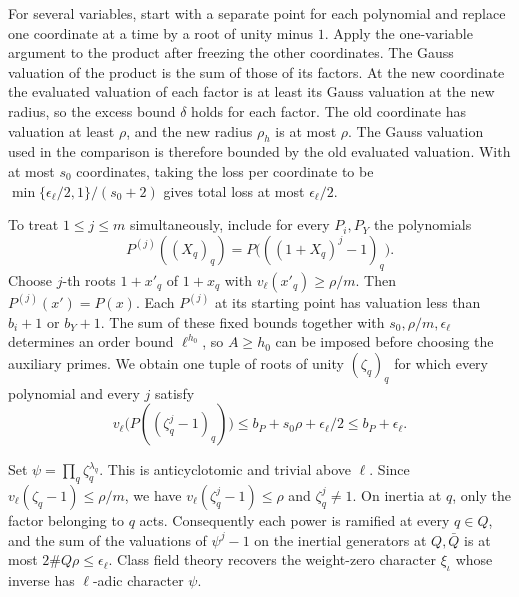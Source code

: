 For several variables, start with a separate point for each polynomial
and replace one coordinate at a time by a root of unity minus \(1\).
Apply the one-variable argument to the product after freezing the other
coordinates. The Gauss valuation of the product is the sum of those
of its factors. At the new coordinate the evaluated valuation of
each factor is at least its Gauss valuation at the new radius, so
the excess bound \(\delta\) holds for each factor. The old coordinate
has valuation at least \(\rho\), and the new radius \(\rho_h\) is
at most \(\rho\). The Gauss valuation used in the comparison is
therefore bounded by the old evaluated valuation. With at most \(s_0\)
coordinates, taking the loss per coordinate to be
\(\min\{\epsilon_\ell/2,1\}/(s_0+2)\) gives total loss at most
\(\epsilon_\ell/2\).

To treat \(1\le j\le m\) simultaneously, include for every \(P_i,P_Y\)
the polynomials
\[
 P^{(j)}((X_q)_q)=P\bigl(((1+X_q)^j-1)_q\bigr).
\]
Choose \(j\)-th roots \(1+x'_q\) of \(1+x_q\) with
\(v_\ell(x'_q)\ge\rho/m\). Then \(P^{(j)}(x')=P(x)\). Each
\(P^{(j)}\) at its starting point has valuation less than \(b_i+1\)
or \(b_Y+1\). The sum of these fixed bounds together with
\(s_0,\rho/m,\epsilon_\ell\) determines an order bound \(\ell^{h_0}\),
so \(A\ge h_0\) can be imposed before choosing the auxiliary primes.
We obtain one tuple of roots of unity \((\zeta_q)_q\) for which
every polynomial and every \(j\) satisfy
\[
 v_\ell\bigl(P((\zeta_q^j-1)_q)\bigr)
       \le b_P+s_0\rho+\epsilon_\ell/2\le b_P+\epsilon_\ell .
\]

Set \(\psi=\prod_q\zeta_q^{\lambda_q}\). This is anticyclotomic and
trivial above \(\ell\). Since \(v_\ell(\zeta_q-1)\le\rho/m\),
we have \(v_\ell(\zeta_q^j-1)\le\rho\) and \(\zeta_q^j\ne1\).
On inertia at \(q\), only the factor belonging to \(q\) acts.
Consequently each power is ramified at every \(q\in Q\), and the
sum of the valuations of \(\psi^j-1\) on the inertial generators
at \(Q,\bar Q\) is at most \(2\#Q\rho\le\epsilon_\ell\). Class
field theory recovers the weight-zero character \(\xi_\iota\)
whose inverse has \(\ell\)-adic character \(\psi\).

